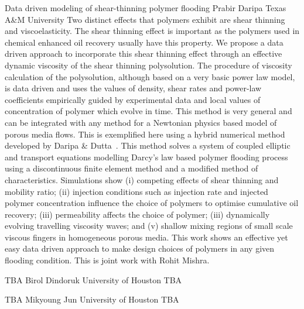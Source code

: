 \begin{addmargin}[2em]{0em}
\vspace{1.5ex}
\abs
{Data driven modeling of shear-thinning polymer flooding}
{Prabir Daripa}
{Texas A\&M University}
{Two distinct effects that polymers exhibit are shear thinning and viscoelasticity. The shear thinning effect is important as the polymers used in chemical enhanced oil recovery usually have this property. We propose a data driven approach to incorporate this shear thinning effect through an  effective dynamic viscosity of the shear thinning polysolution. The procedure of viscosity calculation of the polysolution, although based on a very basic power law model, is data driven and uses the values of density, shear rates and power-law coefficients empirically guided by experimental data and local values of concentration of polymer which evolve in time. This method is very general and can be integrated with any method for a Newtonian physics based model of porous media flows. This is exemplified here using a hybrid numerical method developed by Daripa \& Dutta~\cite{DFEMcode,daripa2017modeling,daripa2019convergence}. This method solves a system of coupled elliptic and transport equations modelling Darcy's law based polymer flooding process using a discontinuous finite element method and a modified method of characteristics. Simulations show (i) competing effects of shear thinning and mobility ratio; (ii) injection conditions such as injection rate and injected polymer concentration influence the choice of polymers to optimise cumulative oil recovery; (iii) permeability affects the choice of polymer; (iii) dynamically evolving travelling viscosity waves; and (v)  shallow mixing regions of small scale viscous fingers in homogeneous porous media. This work shows an effective yet easy data driven approach to make design choices of polymers in any given flooding condition. This is joint work with Rohit Mishra.}

\vspace{1.5ex}
\abs
{TBA}
{Birol Dindoruk}
{University of Houston}
{TBA}


\vspace{1.5ex}
\abs
{TBA}
{Mikyoung Jun}
{University of Houston}
{TBA}


\end{addmargin}
